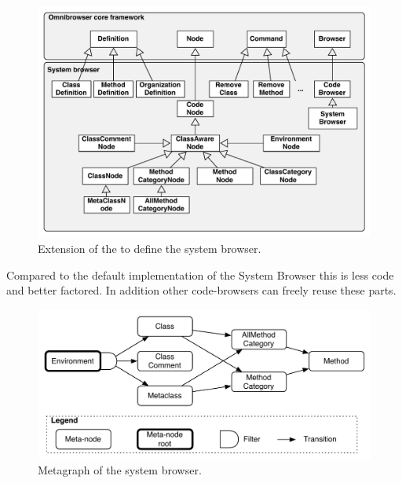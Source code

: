 \documentclass[a4paper,10pt,twoside]{book}
\begin{document}

\begin{figure}[!ht]
\begin{center}
\includegraphics[scale=0.55]{obInternal.pdf}
\caption{Extension of the \obf to define the system browser.} 
\end{center}
\end{figure}


Compared to the default implementation of the \pharo System Browser this is less code and better factored. In addition other code-browsers can freely reuse these parts.

\begin{figure}[!ht]
\begin{center}
\includegraphics[scale=0.55]{ob-graph.pdf}
\caption{Metagraph of the system browser.} 
\end{center}
\end{figure}
\end{document}
